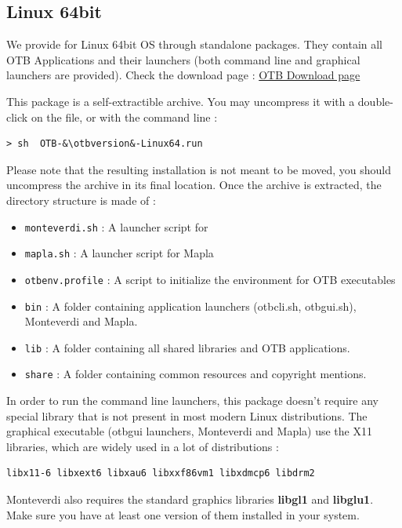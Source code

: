 \subsection{Linux 64bit}

We provide \app for Linux 64bit OS through standalone packages.
They contain all OTB Applications and their launchers (both command line and graphical
launchers are provided). Check the download page :
\href{https://www.orfeo-toolbox.org/download}{OTB Download page}

This package is a self-extractible archive. You may uncompress it with a
double-click on the file, or with the command line :


\begin{lstlisting}[frame=none,numbers=none]
> sh  OTB-&\otbversion&-Linux64.run
\end{lstlisting}

Please note that the resulting installation is not meant to be moved, you should
uncompress the archive in its final location. Once the archive is extracted,
the directory structure is made of :
\begin{itemize}
\item \verb?monteverdi.sh? : A launcher script for \mont
\item \verb?mapla.sh? : A launcher script for Mapla
\item \verb?otbenv.profile? : A script to initialize the environment for OTB executables
\item \verb?bin? : A folder containing application launchers (otbcli\textunderscore *.sh,
otbgui\textunderscore *.sh), Monteverdi and Mapla.
\item \verb?lib? : A folder containing all shared libraries and OTB applications.
\item \verb?share? : A folder containing common resources and copyright mentions.
\end{itemize}

In order to run the command line launchers, this package doesn't require any special
library that is not present in most modern Linux distributions. The graphical
executable (otbgui launchers, Monteverdi and Mapla) use the X11 libraries, which
are widely used in a lot of distributions :
\begin{verbatim}
libx11-6 libxext6 libxau6 libxxf86vm1 libxdmcp6 libdrm2
\end{verbatim}
Monteverdi also requires the standard graphics libraries \textbf{libgl1} and
\textbf{libglu1}. Make sure you have at least one version of them installed in
your system.

